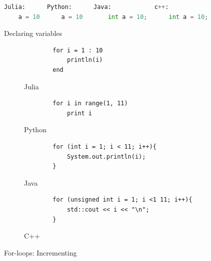 \documentclass[a4paper,11pt]{article}
\begin{document}
\begin{figure}[H]
	\begin{lstlisting}[language=python]
	Julia:	    Python:      Java:            c++:
	a = 10	    a = 10       int a = 10;      int a = 10;
	\end{lstlisting}
	\caption{Declaring variables}
	\label{variables}
\end{figure}

\begin{figure}
	\centering
	\begin{subfigure}[b]{0.7\textwidth}
		\centering
		\begin{lstlisting}
		for i = 1 : 10
			println(i)
		end
		\end{lstlisting}
		\caption{Julia}
	\end{subfigure}
	\begin{subfigure}[b]{0.7\textwidth}
		\centering
		\begin{lstlisting}
		for i in range(1, 11)
			print i
		\end{lstlisting}
		\caption{Python}
	\end{subfigure}	
	\begin{subfigure}[b]{0.7\textwidth}
		\centering
		\begin{lstlisting}
		for (int i = 1; i < 11; i++){
			System.out.println(i);
		}
		\end{lstlisting}
		\caption{Java}
	\end{subfigure}
	\begin{subfigure}[b]{0.7\textwidth}
		\centering
		\begin{lstlisting}
		for (unsigned int i = 1; i <1 11; i++){
			std::cout << i << "\n";
		}
		\end{lstlisting}
		\caption{C++}
	\end{subfigure}
	\caption{For-loops: Incrementing}
	\label{forloop+}
\end{figure}
\end{document}
